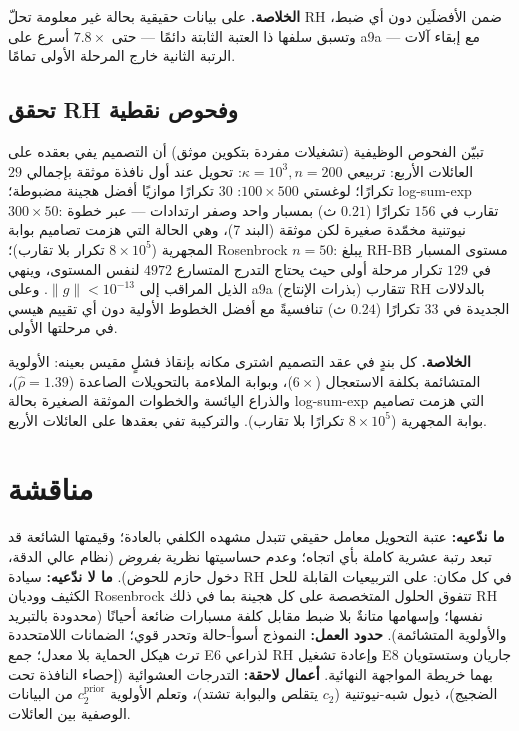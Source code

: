 ﻿\documentclass[12pt]{article}
\newcommand{\gnorm}{\lVert g\rVert}
\begin{document}
\textbf{الخلاصة.} على بيانات حقيقية بحالة غير معلومة تحلّ RH ضمن
الأفضلَين دون أي ضبط، وتسبق سلفها ذا العتبة الثابتة دائمًا --- حتى
$7.8\times$ أسرع على a9a --- مع إبقاء آلات الرتبة الثانية خارج
المرحلة الأولى تمامًا.

\subsection{تحقق RH وفحوص نقطية}
تبيّن الفحوص الوظيفية (تشغيلات مفردة بتكوين موثق) أن التصميم يفي
بعقده على العائلات الأربع: تربيعي $\kappa{=}10^3,n{=}200$: تحويل عند
أول نافذة موثقة بإجمالي $29$ تكرارًا؛ لوغستي $100\times500$:
$30$ تكرارًا موازيًا أفضل هجينة مضبوطة؛ log-sum-exp $300\times50$:
تقارب في $156$ تكرارًا ($0.21$ ث) بمسبار واحد وصفر ارتدادات --- عبر
خطوة نيوتنية مخمّدة صغيرة لكن موثقة (البند 7)، وهي الحالة التي هزمت
تصاميم بوابة المجهرية ($8\times10^{5}$ تكرار بلا تقارب)؛
Rosenbrock $n{=}50$: يبلغ RH-BB مستوى المسبار في $129$ تكرار مرحلة
أولى حيث يحتاج التدرج المتسارع $4972$ لنفس المستوى، وينهي الذيل
المراقب إلى $\gnorm<10^{-13}$. وعلى a9a (بذرات الإنتاج) تتقارب RH
بالدلالات الجديدة في $33$ تكرارًا ($0.24$ ث) تنافسيةً مع أفضل الخطوط
الأولية دون أي تقييم هيسي في مرحلتها الأولى.

\textbf{الخلاصة.} كل بندٍ في عقد التصميم اشترى مكانه بإنقاذ فشلٍ
مقيس بعينه: الأولوية المتشائمة بكلفة الاستعجال ($6\times$)، وبوابة
الملاءمة بالتحويلات الصاعدة ($\hat\rho=1.39$)، والذراع اليائسة
والخطوات الموثقة الصغيرة بحالة log-sum-exp التي هزمت تصاميم بوابة
المجهرية ($8\times10^{5}$ تكرارًا بلا تقارب). والتركيبة تفي بعقدها
على العائلات الأربع.

\section{مناقشة}
\textbf{ما ندّعيه:} عتبة التحويل معامل حقيقي تتبدل مشهده الكلفي
بالعادة؛ وقيمتها الشائعة قد تبعد رتبة عشرية كاملة بأي اتجاه؛ وعدم
حساسيتها نظرية \emph{بفروض} (نظام عالي الدقة، دخول حازم للحوض).
\textbf{ما لا ندّعيه:} سيادة RH في كل مكان: على التربيعيات القابلة
للحل الكثيف ووديان Rosenbrock تتفوق الحلول المتخصصة على كل هجينة
بما في ذلك RH نفسها؛ وإسهامها متانةٌ بلا ضبط مقابل كلفة مسبارات ضائعة
أحيانًا (محدودة بالتبريد والأولوية المتشائمة).
\textbf{حدود العمل:} النموذج أسوأ-حالة وتحدر قوي؛ الضمانات اللامتحددة
ترث هيكل الحماية بلا معدل؛ جمع E6 لذراعي RH وإعادة تشغيل E8 جاريان
وستستويان بهما خريطة المواجهة النهائية.
\textbf{أعمال لاحقة:} التدرجات العشوائية (إحصاء النافذة تحت الضجيج)،
ذيول شبه-نيوتنية ($c_2$ يتقلص والبوابة تشتد)، وتعلم الأولوية
$c_2^{\mathrm{prior}}$ من البيانات الوصفية بين العائلات.
\end{document}
